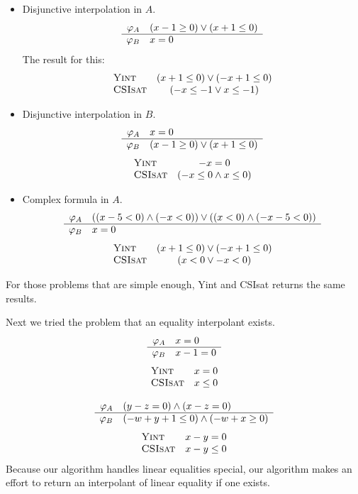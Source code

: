 \begin{itemize}
\item Disjunctive interpolation in $A$.
\[\begin{array}{r l}
\varphi_A & (x-1 \geq 0) \vee (x+1 \leq 0) \\
\hline
\varphi_B & x=0
\end{array}\]
The result for this:
\[\begin{array}{l c}
\text{\textsc{Yint}} & (x+1 \leq 0) \vee (-x+1 \leq 0) \\
\text{\textsc{CSIsat}} & (-x \leq -1 \vee x \leq -1)
\end{array}\]
\item Disjunctive interpolation in $B$.
\[\begin{array}{r l}
\varphi_A & x=0 \\
\hline
\varphi_B & (x-1 \geq 0) \vee (x+1 \leq 0)
\end{array}\]
\[\begin{array}{l c}
\text{\textsc{Yint}} & -x=0 \\
\text{\textsc{CSIsat}} & (-x \leq 0 \wedge x \leq 0)
\end{array}\]
\item Complex formula in $A$.
\[\begin{array}{r l}
\varphi_A & ((x-5<0) \wedge (-x<0)) \vee ((x<0) \wedge (-x-5<0)) \\
\hline
\varphi_B & x=0
\end{array}\]
\[\begin{array}{l c}
\text{\textsc{Yint}} & (x+1 \leq 0) \vee (-x+1 \leq 0) \\
\text{\textsc{CSIsat}} & (x < 0 \vee -x < 0)
\end{array}\]
\end{itemize}
For those problems that are simple enough, Yint and CSIsat returns the
same results.

Next we tried the problem that an equality interpolant exists.
\[\begin{array}{r l}
\varphi_A & x=0 \\
\hline
\varphi_B & x-1=0
\end{array}\]
\[\begin{array}{l c}
\text{\textsc{Yint}} & x=0 \\
\text{\textsc{CSIsat}} & x \leq 0
\end{array}\]

\bigskip\centerline{}

\[\begin{array}{r l}
\varphi_A & (y-z=0) \wedge (x-z=0) \\
\hline
\varphi_B & (-w+y+1 \leq 0) \wedge (-w+x \geq 0)
\end{array}\]
\[\begin{array}{l c}
\text{\textsc{Yint}} & x-y=0 \\
\text{\textsc{CSIsat}} & x-y \leq 0
\end{array}\]
Because our algorithm handles linear equalities special, our algorithm makes an effort to return an interpolant of linear equality if one exists.

